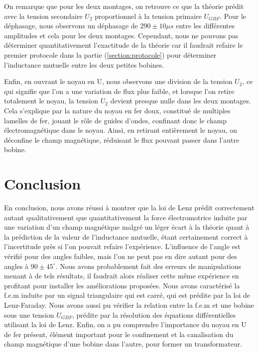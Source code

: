 \documentclass[11pt]{article}
\begin{document}
On remarque que pour les deux montages, on retrouve ce que la théorie prédit avec la tension secondaire $U_2$ proportionnel à la tension primaire $U_{GBF}$. 
Pour le déphasage, nous observons un déphasage de $290 \pm 10 \mu s$ entre les différentes amplitudes et cela pour les deux montages. Cependant, nous ne pouvons
pas déterminer quantitativement l'exactitude de la théorie car il faudrait refaire le premier protocole dans la partie (\ref{section:protocole}) pour déterminer l'inductance mutuelle
entre les deux petites bobines.

Enfin, en ouvrant le noyau en U, nous observons une division de la tension $U_2$, ce qui signifie que l'on a une variation de flux plus faible, et lorsque l'on retire totalement le noyau,
la tension $U_2$ devient presque nulle dans les deux montages. Cela s'explique par la nature du noyau en fer doux, constitué de multiples lamelles de fer, jouant le rôle de guides d'ondes,
confinant donc le champ électromagnétique dans le noyau. Ainsi, en retirant entièrement le noyau, on déconfine le champ magnétique, réduisant le flux pouvant passer dans l'autre bobine.

\section{Conclusion}
En conclusion, nous avons réussi à montrer que la loi de Lenz prédit correctement autant qualitativement que quantitativement la force électromotrice induite 
par une variation d'un champ magnétique malgré un léger écart à la théorie quant à la prédiction de la valeur de l'inductance mutuelle, étant certainement correct à l'incertitude près
si l'on pouvait refaire l'expérience. L'influence de l'angle est vérifié pour des angles faibles, mais l'on ne peut pas en dire autant pour des angles à $90 \pm 45^\circ$. Nous avons probablement
fait des erreurs de manipulations menant à de tels résultats, il faudrait alors réaliser cette même expérience en profitant pour installer les améliorations proposées. Nous avons caractérisé
la f.e.m induite par un signal triangulaire qui est carré, qui est prédite par la loi de Lenz-Faraday. Nous avons aussi pu vérifier la relation entre la f.e.m et une bobine 
sous une tension $U_{GBF}$, prédite par la résolution des équations différentielles utilisant la loi de Lenz. Enfin, on a pu comprendre l'importance du noyau en U
de fer présent, élément important pour le confinement et la canalisation du champ magnétique d'une bobine dans l'autre, pour former un transformateur.
\end{document}
